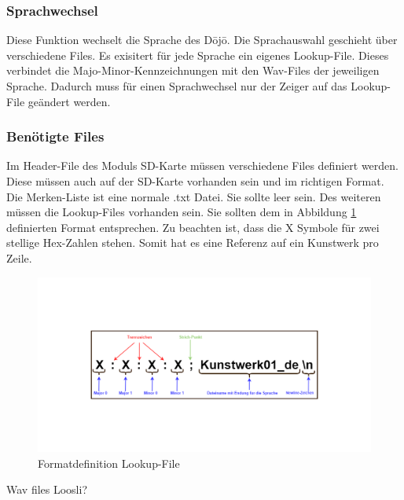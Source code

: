 \subsubsection*{Sprachwechsel}
Diese Funktion wechselt die Sprache des Dōjō. Die Sprachauswahl geschieht über verschiedene Files. Es exisitert für jede Sprache ein eigenes Lookup-File. Dieses verbindet die Majo-Minor-Kennzeichnungen mit den Wav-Files der jeweiligen Sprache. Dadurch muss für einen Sprachwechsel nur der Zeiger auf das Lookup-File geändert werden.

\subsubsection{Benötigte Files}
Im Header-File des Moduls SD-Karte müssen verschiedene Files definiert werden. Diese müssen auch auf der SD-Karte vorhanden sein und im richtigen Format. Die Merken-Liste ist eine normale .txt Datei. Sie sollte leer sein. Des weiteren müssen die Lookup-Files vorhanden sein. Sie sollten dem in Abbildung \ref{fig:definition_lookup_file} definierten Format entsprechen. Zu beachten ist, dass die X Symbole für zwei stellige Hex-Zahlen stehen. Somit hat es eine Referenz auf ein Kunstwerk pro Zeile.

\begin{figure}[H]
	\begin{center}
		\includegraphics[width=140mm]{data/Definition_picture.png}
		\caption[Formatdefinition Lookup-File]{Formatdefinition Lookup-File} %
		\label{fig:definition_lookup_file}
	\end{center}
\end{figure}

Wav files Loosli?

